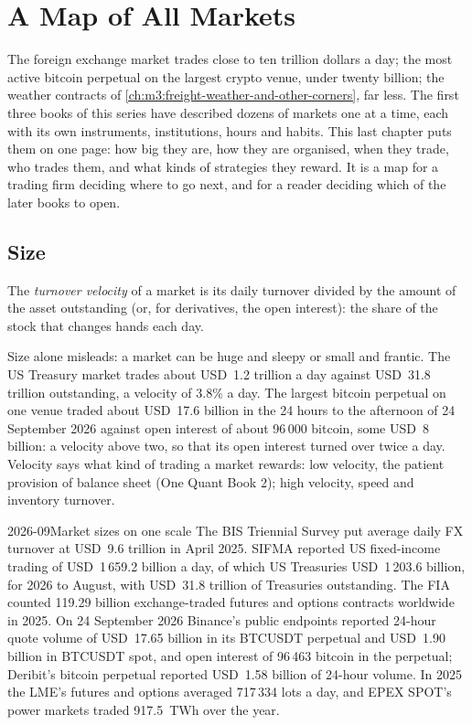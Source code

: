 \chapter{A Map of All Markets}\label{ch:m3:a-map-of-all-markets}

The foreign exchange market trades close to ten trillion dollars a day; the most active bitcoin perpetual on
the largest crypto venue, under twenty billion; the weather contracts of \cref{ch:m3:freight-weather-and-other-corners}, far less. The first
three books of this series have described dozens of markets one at a time, each with its own instruments,
institutions, hours and habits. This last chapter puts them on one page: how big they are, how they are
organised, when they trade, who trades them, and what kinds of strategies they reward. It is a map for a
trading firm deciding where to go next, and for a reader deciding which of the later books to open.

\section{Size}

\begin{definition}\label{def:m3:a-map-of-all-markets:velocity}
The \emph{turnover velocity} of a market is its daily turnover divided by the amount of the asset
outstanding (or, for derivatives, the open interest): the share of the stock that changes hands each day.
\end{definition}

Size alone misleads: a market can be huge and sleepy or small and frantic. The US Treasury market trades about USD~1.2 trillion
a day against USD~31.8 trillion outstanding, a velocity of 3.8\% a day. The largest bitcoin perpetual on one venue traded about
USD~17.6 billion in the 24 hours to the afternoon of 24 September 2026 against open interest of about 96\,000 bitcoin, some USD~8
billion: a velocity above two, so that its open interest turned over twice a day. Velocity says what kind of trading a market rewards:
low velocity, the patient provision of balance sheet (One Quant Book 2); high velocity, speed and inventory turnover.

\begin{dated}{2026-09}{Market sizes on one scale}\label{dat:m3:a-map-of-all-markets:sizes}
The BIS Triennial Survey put average daily FX turnover at USD~9.6 trillion in April 2025. SIFMA reported US fixed-income trading of USD~1\,659.2
billion a day, of which US Treasuries USD~1\,203.6 billion, for 2026 to August, with USD~31.8 trillion of Treasuries outstanding. The FIA counted
119.29 billion exchange-traded futures and options contracts worldwide in 2025. On 24 September 2026 Binance's public endpoints reported 24-hour
quote volume of USD~17.65 billion in its BTCUSDT perpetual and USD~1.90 billion in BTCUSDT spot, and open interest of 96\,463 bitcoin in the
perpetual; Deribit's bitcoin perpetual reported USD~1.58 billion of 24-hour volume. In 2025 the LME's futures and options averaged 717\,334 lots a
day, and EPEX SPOT's power markets traded 917.5~TWh over the year.
\end{dated}

